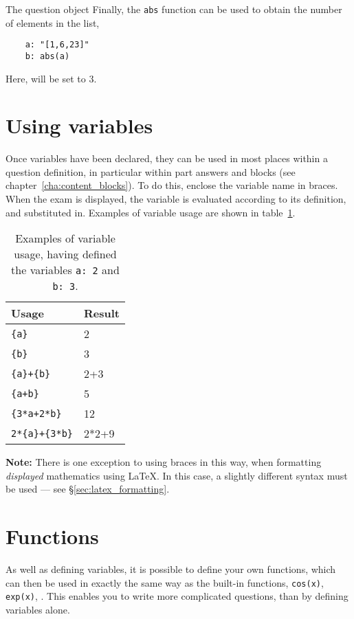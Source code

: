 \begin{chapter}{\label{cha:question_object}The question object}
  Finally, the \verb"abs" function can be used to obtain the number of elements
  in the list, \eg
  \begin{Verbatim}
    a: "[1,6,23]"
    b: abs(a)
  \end{Verbatim}
  Here,  will be set to 3.

  \section{\label{sec:using_variables}Using variables}
  Once variables have been declared, they can be used in most places within a
  question definition, in particular within part answers and
   blocks (see chapter~\ref{cha:content_blocks}).  To do
  this, enclose the variable name in braces.  When the exam is displayed, the
  variable is evaluated according to its definition, and substituted in.
  Examples of variable usage are shown in table~\ref{tab:using_variables}.
  \begin{table}[ht]
    \centering
    \begin{tabular}{ll}
      \hline
      Usage              & Result \\
      \hline
      \verb"{a}"         & 2 \\
      \verb"{b}"         & 3 \\
      \verb"{a}+{b}"     & 2+3 \\
      \verb"{a+b}"       & 5 \\
      \verb"{3*a+2*b}"   & 12 \\
      \verb"2*{a}+{3*b}" & 2*2+9 \\
      \hline\hline
    \end{tabular}
    \caption{\label{tab:using_variables}
      Examples of variable usage, having defined the variables
      \texttt{a: 2} and \texttt{b: 3}.
    }
  \end{table}

  \noindent\textbf{Note:} There is one exception to using braces in this way, when
  formatting \emph{displayed} mathematics using \LaTeX.  In this case, a
  slightly different syntax must be used --- see \S\ref{sec:latex_formatting}.

  \section{\label{sec:functions}Functions}
  As well as defining variables, it is possible to define your own functions,
  which can then be used in exactly the same way as the built-in functions, \eg
  \verb"cos(x)", \verb"exp(x)", \etc.  This enables you to write more
  complicated questions, than by defining variables alone.


\end{chapter}
